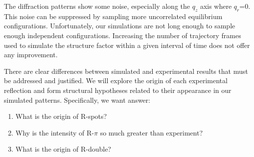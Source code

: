 \documentclass[journal=jpcbfk,manusciprt=article]{achemso}
\begin{document}
  The diffraction patterns show some noise, especially along the $q_z$ axis where $q_r$=0. This
  noise can be suppressed by sampling more uncorrelated equilibrium configurations. Unfortunately,
  our simulations are not long enough to sample enough independent configurations. Increasing the
  number of trajectory frames used to simulate the structure factor within a given interval of time
  does not offer any improvement.
  
  There are clear differences between simulated and experimental results that must be addressed
  and justified. We will explore the origin of each experimental reflection and form structural
  hypotheses related to their appearance in our simulated patterns. Specifically, we want answer:  
  \begin{enumerate}
	\item What is the origin of R-spots?
  	\item Why is the intensity of R-$\pi$ so much greater than experiment?
  	\item What is the origin of R-double?
  \end{enumerate}
  
\end{document}
